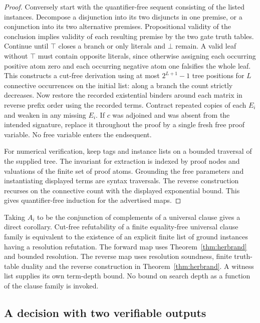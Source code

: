 \begin{proof}
Conversely start with the quantifier-free sequent consisting of the listed instances. Decompose a disjunction into its two disjuncts in one premise, or a conjunction into its two alternative premises. Propositional validity of the conclusion implies validity of each resulting premise by the two gate truth tables. Continue until $\top$ closes a branch or only literals and $\bot$ remain. A valid leaf without $\top$ must contain opposite literals, since otherwise assigning each occurring positive atom zero and each occurring negative atom one falsifies the whole leaf. This constructs a cut-free derivation using at most $2^{L+1}-1$ tree positions for $L$ connective occurrences on the initial list: along a branch the count strictly decreases. Now restore the recorded existential binders around each matrix in reverse prefix order using the recorded terms. Contract repeated copies of each $E_i$ and weaken in any missing $E_i$. If $c$ was adjoined and was absent from the intended signature, replace it throughout the proof by a single fresh free proof variable. No free variable enters the endsequent.

For numerical verification, keep tags and instance lists on a bounded traversal of the supplied tree. The invariant for extraction is indexed by proof nodes and valuations of the finite set of proof atoms. Grounding the free parameters and instantiating displayed terms are syntax traversals. The reverse construction recurses on the connective count with the displayed exponential bound. This gives quantifier-free induction for the advertised maps.
\end{proof}

Taking $A_i$ to be the conjunction of complements of a universal clause gives a direct corollary. Cut-free refutability of a finite equality-free universal clause family is equivalent to the existence of an explicit finite list of ground instances having a resolution refutation. The forward map uses Theorem~\ref{thm:herbrand} and bounded resolution. The reverse map uses resolution soundness, finite truth-table duality and the reverse construction in Theorem~\ref{thm:herbrand}. A witness list supplies its own term-depth bound. No bound on search depth as a function of the clause family is invoked.

\subsection{A decision with two verifiable outputs}

